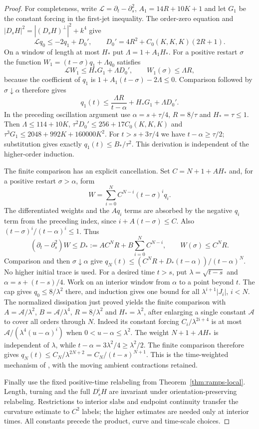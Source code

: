 \begin{proof}
For completeness, write $\mathcal L=\partial_t-\partial_s^2$,
$A_1=14R+10K+1$ and let $G_1$ be the constant forcing in
the first-jet inequality.  The order-zero equation and
$|D_sH|^2=|(D_sH)^\perp|^2+k^4$ give
\[
 \mathcal Lq_0\leq-2q_1+D_0',\qquad
 D_0'=4R^2+C_0(K,K,K)(2R+1).
\]
On a window of length at most $H_*$ put $\Lambda=1+A_1H_*$.
For a positive restart $\sigma$ the function
$W_1=(t-\sigma)q_1+\Lambda q_0$ satisfies
\[
 \mathcal LW_1\leq H_*G_1+\Lambda D_0',\qquad
 W_1(\sigma)\leq\Lambda R,
\]
because the coefficient of $q_1$ is
$1+A_1(t-\sigma)-2\Lambda\leq0$.
Comparison followed by $\sigma\downarrow\alpha$ therefore gives
\[
 q_1(t)\leq\frac{\Lambda R}{t-\alpha}
                         +H_*G_1+\Lambda D_0'.
\]
In the preceding oscillation argument use
$\alpha=s+\tau/4$, $R=8/\tau$ and $H_*=\tau\leq1$.
Then $\Lambda\leq114+10K$,
$\tau^2D_0'\leq256+17C_0(K,K,K)$ and
$\tau^3G_1\leq2048+992K+160000K^2$.
For $t>s+3\tau/4$ we have $t-\alpha\geq\tau/2$;
substitution gives exactly $q_1(t)\leq B_*/\tau^2$.
This derivation is independent of the higher-order induction.

The finite comparison has an explicit cancellation.  Set
$C=N+1+AH_*$ and, for a positive restart $\sigma>\alpha$, form
\[
 W=\sum_{i=0}^N C^{N-i}(t-\sigma)^i q_i.
\]
The differentiated weights and the $Aq_i$ terms are absorbed by the
negative $q_i$ term from the preceding index, since
$i+A(t-\sigma)\leq C$.  Also $(t-\sigma)^i/(t-\alpha)^i\leq1$.
Thus
\[
 (\partial_t-\partial_s^2)W\leq
 D_*:=AC^NR+B\sum_{i=0}^NC^{N-i},\qquad W(\sigma)\leq C^NR.
\]
Comparison and then $\sigma\downarrow\alpha$ give
$q_N(t)\leq(C^NR+D_*(t-\alpha))/(t-\alpha)^N$.
No higher initial trace is used.  For a desired time $t>s$, put
$\lambda=\sqrt{t-s}$ and $\alpha=s+(t-s)/4$.
Work on an interior window from $\alpha$ to a point beyond $t$.
The cap gives $q_0\le8/\lambda^2$ there, and induction gives
one bound for all $\lambda^{i+1}|J_i|$, $i<N$.
The normalized dissipation just proved yields the finite
comparison with $A=\mathcal A/\lambda^2$,
$B=\mathcal A/\lambda^4$, $R=8/\lambda^2$ and
$H_*=\lambda^2$, after enlarging a single constant
$\mathcal A$ to cover all orders through $N$.
Indeed its constant forcing
$C_i/\lambda^{2i+4}$ is at most
$\mathcal A/(\lambda^4(u-\alpha)^i)$ when
$0<u-\alpha\le\lambda^2$.
The weight $N+1+AH_*$ is independent of $\lambda$, while
$t-\alpha=3\lambda^2/4\ge\lambda^2/2$.
The finite comparison therefore gives
$q_N(t)\le C_N/\lambda^{2N+2}=C_N/(t-s)^{N+1}$.
This is the time-weighted mechanism of
\cite[Theorem 3.1, pp.~4--6]{AltschulerIMA822}, with the moving ambient
contractions retained.

Finally use the fixed positive-time relabeling from
Theorem~\ref{thm:ramps-local}.  Length, turning and the full $D_s^iH$ are
invariant under orientation-preserving relabeling.  Restrictions to interior
slabs and endpoint continuity transfer the curvature estimate to $C^2$
labels; the higher estimates are needed only at interior times.
All constants precede the product, curve and time-scale choices.
\end{proof}

